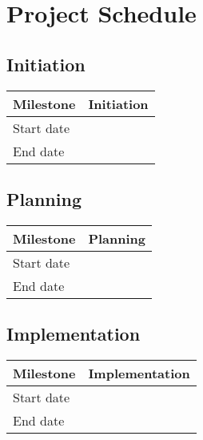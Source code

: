 \documentclass[qipps.tex]{subfiles}
\begin{document}
\section{Project Schedule}
\ifdraft{
}{}

\subsection{Initiation}
\begin{tabu} to 170mm {|X[1,l]|X[5,c]|} \hline
Milestone   & Initiation \\ \hline
Start date  &  \\ \hline
End date    &  \\ \hline
\end{tabu}

\subsection{Planning}
\ifdraft{
}{}
\begin{tabu} to 170mm {|X[1,l]|X[5,c]|} \hline
Milestone   & Planning \\ \hline
Start date  &  \\ \hline
End date    &  \\ \hline
\end{tabu}

\subsection{Implementation}
\ifdraft{
}{}
\begin{tabu} to 170mm {|X[1,l]|X[5,c]|} \hline
Milestone   & Implementation \\ \hline
Start date  &  \\ \hline
End date    &  \\ \hline
\end{tabu}
\end{document}
